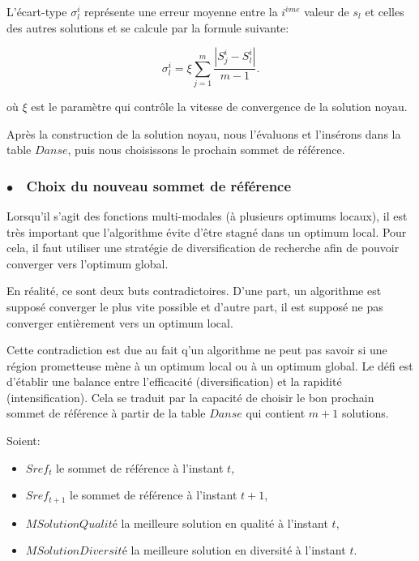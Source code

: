 L'écart-type $\sigma^i_l$ représente une erreur moyenne entre la $i^{ème}$ valeur de $s_l$ et celles des autres solutions et se calcule par la formule suivante:

$$
\sigma_l^i = \xi \sum_{j=1}^{m} \frac{|S_j^i - S_l^i|}{m-1}.
$$

où $\xi$ est le paramètre qui contrôle la vitesse de convergence de la solution noyau.

Après la construction de la solution noyau, nous l'évaluons et l'insérons dans la table $Danse$, puis nous choisissons le prochain sommet de référence.

\subsubsection{$\bullet\quad$Choix du nouveau sommet de référence}
Lorsqu'il s'agit des fonctions multi-modales (à plusieurs optimums locaux), il est très important que l'algorithme évite d'être stagné dans un optimum local. Pour cela, il faut utiliser une stratégie de diversification de recherche afin de pouvoir converger vers l'optimum global. 

En réalité, ce sont deux buts contradictoires. D'une part, un algorithme est supposé converger le plus vite possible et d'autre part, il est supposé ne pas converger entièrement vers un optimum local.

Cette contradiction est due au fait q'un algorithme ne peut pas savoir si une région prometteuse mène à un optimum local ou à un optimum global. Le défi est d'établir une balance entre l'efficacité (diversification) et la rapidité (intensification). Cela se traduit par la capacité de choisir le bon prochain sommet de référence à partir de la table $Danse$ qui contient $m+1$ solutions.

Soient:

\begin{itemize}
	\item $Sref_t$ le sommet de référence à l'instant $t$,
	\item $Sref_{t+1}$ le sommet de référence à l'instant $t+1$,
	\item $MSolutionQualité$ la meilleure solution en qualité à l'instant $t$,
	\item $MSolution Diversité$ la meilleure solution en diversité à l'instant $t$.
\end{itemize}

